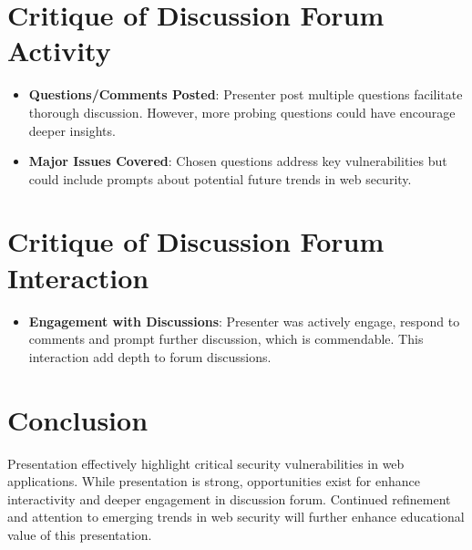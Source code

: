 \documentclass{article}
\begin{document}
\section{Critique of Discussion Forum Activity}
\begin{itemize}
    \item \textbf{Questions/Comments Posted}: Presenter post multiple questions facilitate thorough discussion. However, more probing questions could have encourage deeper insights.
    \item \textbf{Major Issues Covered}: Chosen questions address key vulnerabilities but could include prompts about potential future trends in web security.
\end{itemize}

\section{Critique of Discussion Forum Interaction}
\begin{itemize}
    \item \textbf{Engagement with Discussions}: Presenter was actively engage, respond to comments and prompt further discussion, which is commendable. This interaction add depth to forum discussions.
\end{itemize}

\section{Conclusion}
Presentation effectively highlight critical security vulnerabilities in web applications. While presentation is strong, opportunities exist for enhance interactivity and deeper engagement in discussion forum. Continued refinement and attention to emerging trends in web security will further enhance educational value of this presentation.
\end{document}
